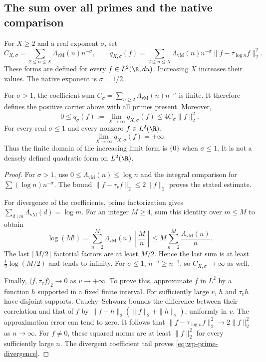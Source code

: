 \subsection{The sum over all primes and the native comparison}

For $X\geq2$ and a real exponent $\sigma$, set
\[
 C_{X,\sigma}=\sum_{2\leq n\leq X}
               \Lambda_{\mathrm{vM}}(n)n^{-\sigma},\qquad
 q_{X,\sigma}(f)=\sum_{2\leq n\leq X}
    \Lambda_{\mathrm{vM}}(n)n^{-\sigma}
                        \|f-\tau_{\log n}f\|_2^2.
\]
These forms are defined for every $f\in L^2(\R,du)$.
Increasing $X$ increases their values.
The native exponent is $\sigma=1/2$.

\begin{theorem}
\label{thm:wp-prime-limit}
For $\sigma>1$, the coefficient sum
$C_\sigma=\sum_{n\geq2}\Lambda_{\mathrm{vM}}(n)n^{-\sigma}$ is finite.
It therefore defines the positive carrier above with all primes present.
Moreover,
\[
 0\leq q_\sigma(f):=\lim_{X\to\infty}q_{X,\sigma}(f)
 \leq4C_\sigma\|f\|_2^2.
\]
For every real $\sigma\leq1$ and every nonzero $f\in L^2(\R)$,
\begin{equation}
 \lim_{X\to\infty}q_{X,\sigma}(f)=+\infty.
 \label{eq:wp-prime-divergence}
\end{equation}
Thus the finite domain of the increasing limit form is $\{0\}$
when $\sigma\leq1$.
It is not a densely defined quadratic form on $L^2(\R)$.
\end{theorem}
\begin{proof}
For $\sigma>1$, use
$0\leq\Lambda_{\mathrm{vM}}(n)\leq\log n$ and the integral comparison
for $\sum(\log n)n^{-\sigma}$.
The bound $\|f-\tau_v f\|_2\leq2\|f\|_2$ proves the stated estimate.

For divergence of the coefficients, prime factorization gives
$\sum_{d\mid m}\Lambda_{\mathrm{vM}}(d)=\log m$.
For an integer $M\geq4$, sum this identity over $m\leq M$ to obtain
\[
 \log(M!)=\sum_{n=2}^M\Lambda_{\mathrm{vM}}(n)
                          \left\lfloor\frac Mn\right\rfloor
 \leq M\sum_{n=2}^M\frac{\Lambda_{\mathrm{vM}}(n)}n.
\]
The last $\lceil M/2\rceil$ factorial factors are at least $M/2$.
Hence the last sum is at least $\frac12\log(M/2)$ and tends to infinity.
For $\sigma\leq1$, $n^{-\sigma}\geq n^{-1}$, so
$C_{X,\sigma}\to\infty$ as well.

Finally, $\langle f,\tau_v f\rangle_2\to0$ as $v\to+\infty$.
To prove this, approximate $f$ in $L^2$ by a function $h$ supported
in a fixed finite interval.
For sufficiently large $v$, $h$ and $\tau_vh$ have disjoint supports.
Cauchy--Schwarz bounds the difference between their correlation and
that of $f$ by $\|f-h\|_2(\|f\|_2+\|h\|_2)$, uniformly in $v$.
The approximation error can tend to zero.
It follows that
$\|f-\tau_{\log n}f\|_2^2\to2\|f\|_2^2$ as $n\to\infty$.
For $f\ne0$, these squared norms are at least $\|f\|_2^2$
for every sufficiently large $n$.
The divergent coefficient tail proves \eqref{eq:wp-prime-divergence}.
\end{proof}

